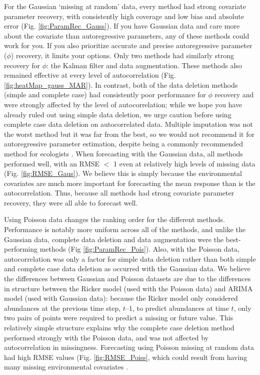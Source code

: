 \documentclass{article}
\begin{document}
\begin{linenumbers}
For the Gaussian ‘missing at random’ data, every method had strong covariate parameter recovery, with consistently high coverage and low bias and absolute error (Fig. \ref{fig:ParamRec_Gauss}). If you have Gaussian data and care more about the covariate than autoregressive parameters, any of these methods could work for you. If you also prioritize accurate and precise autoregressive parameter ($\phi$) recovery, it limits your options. Only two methods had similarly strong recovery for $\phi$: the Kalman filter and data augmentation. These methods also remained effective at every level of autocorrelation (Fig. \ref{fig:heatMap_gauss_MAR}). In contrast, both of the data deletion methods (simple and complete case) had consistently poor performance for $\phi$ recovery and were strongly affected by the level of autocorrelation; while we hope you have already ruled out using simple data deletion, we urge caution before using complete case data deletion on autocorrelated data. Multiple imputation was not the worst method but it was far from the best, so we would not recommend it for autoregressive parameter estimation, despite being a commonly recommended method for ecologists \citep{nakagawa_missing_2008,ellington_using_2015}.  When forecasting with the Gaussian data, all methods performed well, with an RMSE $<$ 1 even at relatively high levels of missing data (Fig. \ref{fig:RMSE_Gaus}). We believe this is simply because the environmental covariates are much more important for forecasting the mean response than is the autocorrelation. Thus, because all methods had strong covariate parameter recovery, they were all able to forecast well.

Using Poisson data changes the ranking order for the different methods. Performance is notably more uniform across all of the methods, and unlike the Gaussian data, complete data deletion and data augmentation were the best-performing methods (Fig \ref{fig:ParamRec_Pois}). Also, with the Poisson data, autocorrelation was only a factor for simple data deletion rather than both simple and complete case data deletion as occurred with the Gaussian data.  We believe the differences between Gaussian and Poisson datasets are due to the differences in structure between the Ricker model (used with the Poisson data) and ARIMA model (used with Gaussian data): because the Ricker model only considered abundances at the previous time step,  $t – 1$,  to predict abundances at time $t$, only two pairs of points were required to predict a missing or future value. This relatively simple structure explains why the complete case deletion method performed strongly with the Poisson data, and was not affected by autocorrelation in missingness. Forecasting using Poisson missing at random data had high RMSE values (Fig. \ref{fig:RMSE_Poiss}, which could result from having many missing environmental covariates \citep{lebreton1990modelling}. 
         

\end{linenumbers}
\end{document}
